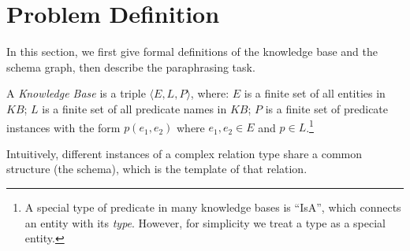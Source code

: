 \section{Problem Definition}
\label{sec:problem}

In this section, we first give formal definitions of the knowledge base
and the schema graph, then describe the paraphrasing task.

\begin{definition}
A {\em Knowledge Base} is a triple $\langle E, L, P\rangle$, where:
$E$ is a finite set of all entities in $KB$;
$L$ is a finite set of all predicate names in $KB$;
$P$ is a finite set of predicate instances with the form
$p(e_1, e_2)$ where $e_1, e_2 \in E$ and $p \in L$.\footnote{A special
type of predicate in many knowledge bases is ``IsA'', which connects an
entity with its {\em type}. However, for simplicity we treat a type as a
special entity.}
\end{definition}


Intuitively, different instances of a complex relation type share a
common structure (the schema), which is the template of that relation.

